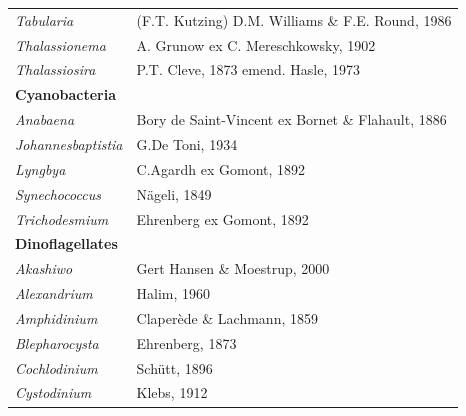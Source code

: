 \documentclass[draft]{agujournal2019}
\begin{document}
\begin{table}
{\begin{tabular}{@{}ll@{}}
\textit{Tabularia}         & (F.T. Kutzing) D.M. Williams \& F.E. Round, 1986           \\
\textit{Thalassionema}     & A. Grunow ex C. Mereschkowsky, 1902                        \\
\textit{Thalassiosira}     & P.T. Cleve, 1873 emend. Hasle, 1973                        \\
\textbf{Cyanobacteria}     &                                                            \\
\textit{Anabaena}          & Bory de Saint-Vincent ex Bornet \& Flahault, 1886          \\
\textit{Johannesbaptistia} & G.De Toni, 1934                                            \\
\textit{Lyngbya}           & C.Agardh ex Gomont, 1892                                   \\
\textit{Synechococcus}     & Nägeli, 1849                                               \\
\textit{Trichodesmium}     & Ehrenberg ex Gomont, 1892                                  \\
\textbf{Dinoflagellates}    &                                                            \\
\textit{Akashiwo}          & Gert Hansen \& Moestrup, 2000                              \\
\textit{Alexandrium}       & Halim, 1960                                                \\
\textit{Amphidinium}       & Claperède \& Lachmann, 1859                                \\
\textit{Blepharocysta}     & Ehrenberg, 1873                                            \\
\textit{Cochlodinium}      & Schütt, 1896                                               \\
\textit{Cystodinium}       & Klebs, 1912                                                \\


\end{tabular}}
\end{table}
\end{document}
